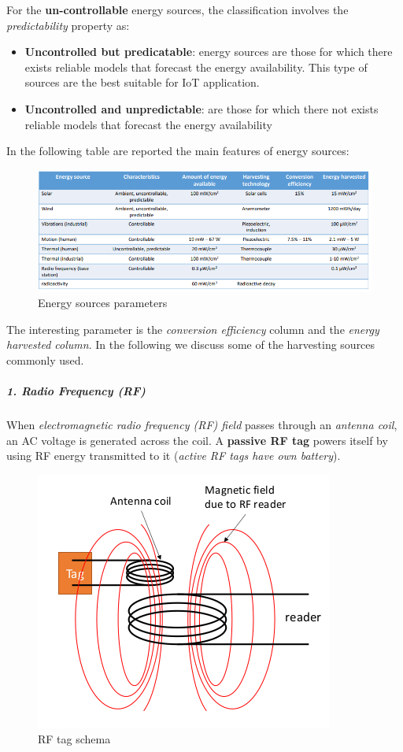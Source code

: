 \documentclass[10pt,a4paper]{report}
\theoremstyle{definition}
\begin{document}
For the \textbf{un-controllable} energy sources, the classification involves the \textit{predictability} property as:
\begin{itemize}
	\item 
	\textbf{Uncontrolled but predicatable}: energy sources are those for which there exists reliable models that forecast the energy availability. This type of sources are the best suitable for IoT application.
	\item 
	\textbf{Uncontrolled and unpredictable}: are those for which there not exists reliable models that forecast the energy availability
\end{itemize}

In the following table are reported the main features of energy sources:
\begin{figure}[h]
	\centering\includegraphics[scale=0.50]{images/Pasted image 20230505162831.png}
	\caption{Energy sources parameters}
\end{figure}

The interesting parameter is the \textit{conversion efficiency} column and the \textit{energy harvested column}.
In the following we discuss some of the harvesting sources commonly used.
\subparagraph{1. Radio Frequency (RF)}\label{sec:1-radio-frequency-rf}
When \textit{electromagnetic radio frequency (RF) field} passes through an \textit{antenna coil}, an AC voltage is generated across the coil. A \textbf{passive RF tag} powers itself by using RF energy transmitted to it (\textit{active RF tags have own battery}).
\begin{figure}[h]
	\centering\includegraphics[scale=0.50]{images/Pasted image 20230506081233.png}
	\caption{RF tag schema}
\end{figure}
\end{document}
